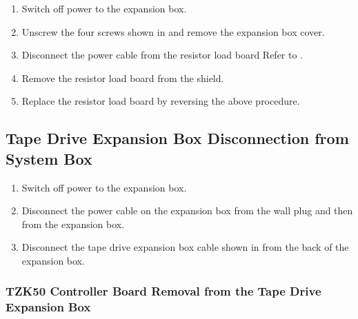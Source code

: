 \begin{enumerate}
\item	Switch off power to the expansion box.

\item	Unscrew the four screws shown in  and remove the expansion box cover.

\newpage

\item	Disconnect the power cable from the resistor load board Refer to .

\item	Remove the resistor load board from the shield.

\item	Replace the resistor load board by reversing the above procedure.
\end{enumerate}
\newpage

\subsection{Tape Drive Expansion Box Disconnection from System Box}

\begin{enumerate}
\item	Switch off power to the expansion box.
\item	Disconnect the power cable on the expansion box from the wall plug
		and then from the expansion box.
\item	Disconnect the tape drive expansion box cable shown in 
		from the back of the expansion box.
\end{enumerate}
\newpage

\subsubsection{TZK50 Controller Board Removal from the Tape Drive Expansion Box}

